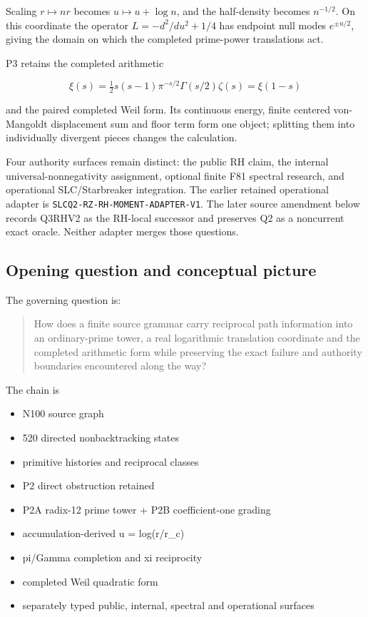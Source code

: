 Scaling \(r\mapsto nr\) becomes \(u\mapsto u+\log n\), and the
half-density becomes \(n^{-1/2}\). On this coordinate the operator
\(L=-d^2/du^2+1/4\) has endpoint null modes \(e^{\pm u/2}\), giving the
domain on which the completed prime-power translations act.

P3 retains the completed arithmetic

\[
\xi(s)=\tfrac12s(s-1)\pi^{-s/2}\Gamma(s/2)\zeta(s)=\xi(1-s)
\]

and the paired completed Weil form. Its continuous energy, finite
centered von-Mangoldt displacement sum and floor term form one object;
splitting them into individually divergent pieces changes the
calculation.

Four authority surfaces remain distinct: the public RH claim, the
internal universal-nonnegativity assignment, optional finite F81
spectral research, and operational SLC/Starbreaker integration. The
earlier retained operational adapter is
\nolinkurl{SLCQ2-RZ-RH-MOMENT-ADAPTER-V1}. The later source amendment below
records Q3RHV2 as the RH-local successor and preserves Q2 as a
noncurrent exact oracle. Neither adapter merges those questions.

\subsection{Opening question and conceptual
picture}\label{viii-ch09-opening-question-and-conceptual-picture}

The governing question is:

\begin{quote}
How does a finite source grammar carry reciprocal path information into
an ordinary-prime tower, a real logarithmic translation coordinate and
the completed arithmetic form while preserving the exact failure and
authority boundaries encountered along the way?
\end{quote}

The chain is

\begin{itemize}
\tightlist
\item
  N100 source graph
\item
  520 directed nonbacktracking states
\item
  primitive histories and reciprocal classes
\item
  P2 direct obstruction retained
\item
  P2A radix-12 prime tower + P2B coefficient-one grading
\item
  accumulation-derived u = log(r/r\_c)
\item
  pi/Gamma completion and xi reciprocity
\item
  completed Weil quadratic form
\item
  separately typed public, internal, spectral and operational surfaces
\end{itemize}

